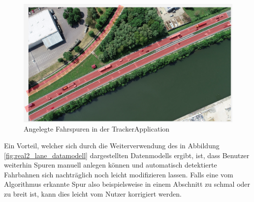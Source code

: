 \begin{figure}[H]
    \centering
    \includegraphics[align=c, width=0.6\linewidth]{resources/img/umsetzung/U2/LaneCreator_Example}
    \caption{Angelegte Fahrspuren in der TrackerApplication}
    \label{fig:real2_lanes_trackerApplication}
\end{figure}

Ein Vorteil, welcher sich durch die Weiterverwendung des in Abbildung \ref{fig:real2_lane_datamodell}
dargestellten Datenmodells ergibt, ist, dass Benutzer weiterhin Spuren manuell anlegen können und automatisch
detektierte Fahrbahnen sich nachträglich noch leicht modifizieren lassen. Falls eine vom Algorithmus erkannte
Spur also beispielsweise in einem Abschnitt zu schmal oder zu breit ist, kann dies leicht vom Nutzer korrigiert
werden. 
